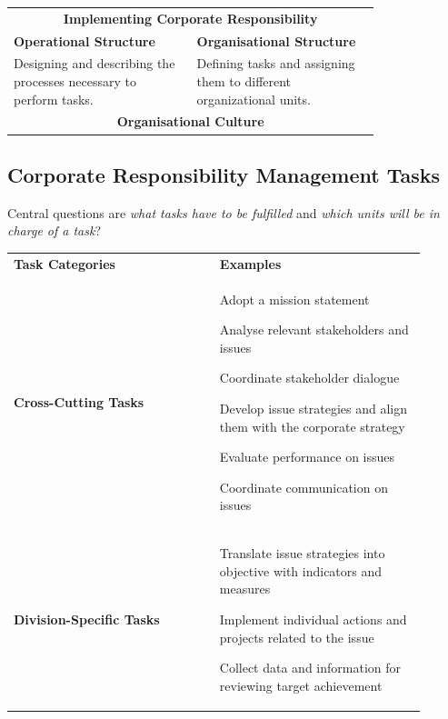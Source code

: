 \documentclass[11pt]{article}
\theoremstyle{definition}
\begin{document}
\vspace*{0.5em}
\begin{tabularx}{\linewidth}{p{0.4\linewidth} p{0.4\linewidth}}
	\multicolumn{2}{c}{\cellcolor{DodgerBlue1!40} {\large\textbf{Implementing Corporate Responsibility}}}\\[0.5em]
	\textbf{Operational Structure} & \textbf{Organisational Structure} \\[0.5em]
	Designing and describing the processes necessary to perform tasks. & Defining tasks and assigning them to different organizational units. \\[2em]
	\multicolumn{2}{c}{\textbf{Organisational Culture}}
\end{tabularx}

\subsection{Corporate Responsibility Management Tasks}
Central questions are \textit{what tasks have to be fulfilled} and \textit{which units will be in charge of a task}?
\begin{tabularx}{\linewidth}{p{0.45\linewidth} p{0.45\linewidth}}
	\cellcolor{DodgerBlue1!40} \textbf{Task Categories} & \cellcolor{DodgerBlue1!40} \textbf{Examples}\\[1em]
	\textbf{Cross-Cutting Tasks} & \begin{itemize}
		[
		left=0pt,
		nosep,
		before={\begin{minipage}[t]{\hsize}},
			after={\end{minipage}}
		]
		\item Adopt a mission statement
		\item Analyse relevant stakeholders and issues
		\item Coordinate stakeholder dialogue
		\item Develop issue strategies and align them with the corporate strategy
		\item Evaluate performance on issues
		\item Coordinate communication on issues
	\end{itemize}\\
	\textbf{Division-Specific Tasks} & \begin{itemize}
		[
		left=0pt,
		nosep,
		before={\begin{minipage}[t]{\hsize}},
			after={\end{minipage}}
		]
		\item Translate issue strategies into objective with indicators and measures
		\item Implement individual actions and projects related to the issue
		\item Collect data and information for reviewing target achievement
	\end{itemize}
\end{tabularx}
\end{document}
